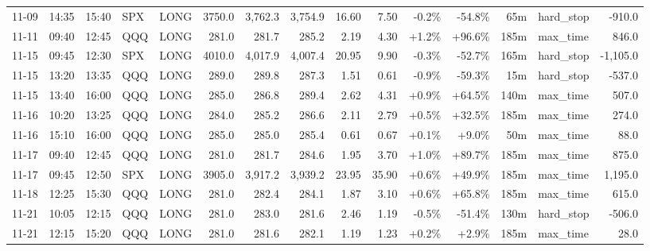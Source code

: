 \documentclass[11pt,a4paper,twoside]{article}
\begin{document}
\begin{landscape}
\begin{center}
\begin{longtable}{>{\color{txtmain}}l l l l l r r r r r r r r >{\color{txtmain}}l r}
11-09 & 14:35 & 15:40 & SPX & LONG & 3750.0 & 3,762.3 & 3,754.9 & 16.60 & 7.50 & \textcolor{lossred}{-0.2\%} & \textcolor{lossred}{-54.8\%} & 65m & hard\_stop & \textcolor{lossred}{-910.0} \\
11-11 & 09:40 & 12:45 & QQQ & LONG & 281.0 & 281.7 & 285.2 & 2.19 & 4.30 & \textcolor{wingreen}{+1.2\%} & \textcolor{wingreen}{+96.6\%} & 185m & max\_time & \textcolor{wingreen}{846.0} \\
11-15 & 09:45 & 12:30 & SPX & LONG & 4010.0 & 4,017.9 & 4,007.4 & 20.95 & 9.90 & \textcolor{lossred}{-0.3\%} & \textcolor{lossred}{-52.7\%} & 165m & hard\_stop & \textcolor{lossred}{-1,105.0} \\
11-15 & 13:20 & 13:35 & QQQ & LONG & 289.0 & 289.8 & 287.3 & 1.51 & 0.61 & \textcolor{lossred}{-0.9\%} & \textcolor{lossred}{-59.3\%} & 15m & hard\_stop & \textcolor{lossred}{-537.0} \\
11-15 & 13:40 & 16:00 & QQQ & LONG & 285.0 & 286.8 & 289.4 & 2.62 & 4.31 & \textcolor{wingreen}{+0.9\%} & \textcolor{wingreen}{+64.5\%} & 140m & max\_time & \textcolor{wingreen}{507.0} \\
11-16 & 10:20 & 13:25 & QQQ & LONG & 284.0 & 285.2 & 286.6 & 2.11 & 2.79 & \textcolor{wingreen}{+0.5\%} & \textcolor{wingreen}{+32.5\%} & 185m & max\_time & \textcolor{wingreen}{274.0} \\
11-16 & 15:10 & 16:00 & QQQ & LONG & 285.0 & 285.0 & 285.4 & 0.61 & 0.67 & \textcolor{wingreen}{+0.1\%} & \textcolor{wingreen}{+9.0\%} & 50m & max\_time & \textcolor{wingreen}{88.0} \\
11-17 & 09:40 & 12:45 & QQQ & LONG & 281.0 & 281.7 & 284.6 & 1.95 & 3.70 & \textcolor{wingreen}{+1.0\%} & \textcolor{wingreen}{+89.7\%} & 185m & max\_time & \textcolor{wingreen}{875.0} \\
11-17 & 09:45 & 12:50 & SPX & LONG & 3905.0 & 3,917.2 & 3,939.2 & 23.95 & 35.90 & \textcolor{wingreen}{+0.6\%} & \textcolor{wingreen}{+49.9\%} & 185m & max\_time & \textcolor{wingreen}{1,195.0} \\
11-18 & 12:25 & 15:30 & QQQ & LONG & 281.0 & 282.4 & 284.1 & 1.87 & 3.10 & \textcolor{wingreen}{+0.6\%} & \textcolor{wingreen}{+65.8\%} & 185m & max\_time & \textcolor{wingreen}{615.0} \\
11-21 & 10:05 & 12:15 & QQQ & LONG & 281.0 & 283.0 & 281.6 & 2.46 & 1.19 & \textcolor{lossred}{-0.5\%} & \textcolor{lossred}{-51.4\%} & 130m & hard\_stop & \textcolor{lossred}{-506.0} \\
11-21 & 12:15 & 15:20 & QQQ & LONG & 281.0 & 281.6 & 282.1 & 1.19 & 1.23 & \textcolor{wingreen}{+0.2\%} & \textcolor{wingreen}{+2.9\%} & 185m & max\_time & \textcolor{wingreen}{28.0} \\

\end{longtable}
\end{center}
\end{landscape}
\end{document}
